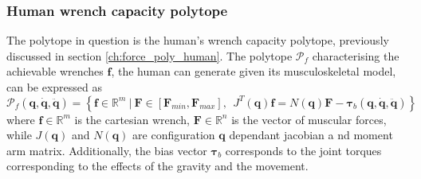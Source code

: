 \subsubsection{Human wrench capacity polytope}
The polytope in question is the human's wrench capacity polytope, previously discussed in section \ref{ch:force_poly_human}. The polytope $\mathcal{P}_f$ characterising the achievable wrenches $\bm{f}$, the human can generate given its musculoskeletal model, can be expressed as 
\begin{equation}
    \mathcal{P}_f(\bm{q},\dot{\bm{q}},\ddot{\bm{q}}) = \left\{ \bm{f} \in \mathbb{R}^m ~|~ \bm{F}\in\left[\bm{F}_{min}, \bm{F}_{max} \right], ~~ \!J^T(\bm{q})\bm{f} =\! N(\bm{q})\bm{F} -\bm{\tau}_b(\bm{q},\dot{\bm{q}},\ddot{\bm{q}}) \right\}
    \label{eq:human_force_poly_revisit2}
\end{equation}
where $\bm{f}\in\mathbb{R}^m$ is the cartesian wrench, $\bm{F}\in\mathbb{R}^n$ is the vector of muscular forces, while $J(\bm{q})$ and $N(\bm{q})$ are configuration $\bm{q}$ dependant jacobian a nd moment arm matrix. Additionally, the bias vector $\bm{\tau}_b$ corresponds to the joint torques corresponding to the effects of the gravity and the movement. 

